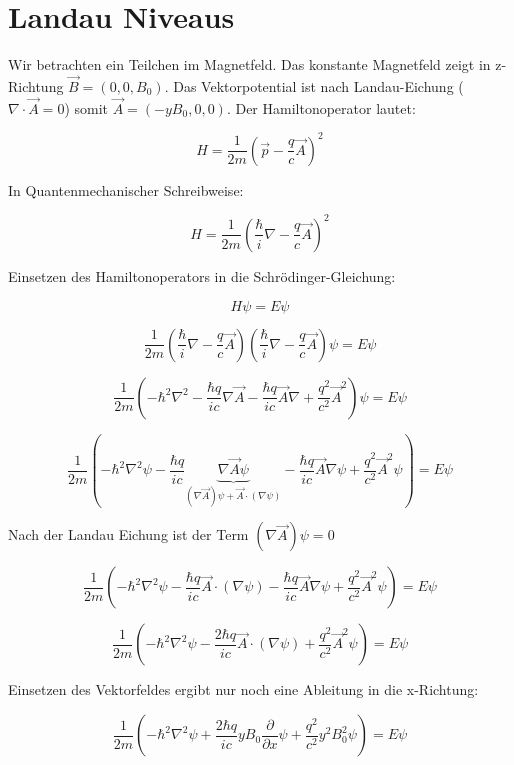 



\section*{Landau Niveaus}

Wir betrachten ein Teilchen im Magnetfeld. Das konstante Magnetfeld zeigt in z-Richtung \(\vec B=(0,0,B_0)\). Das Vektorpotential ist nach Landau-Eichung (\(\nabla\cdot\vec A = 0\)) somit \(\vec A = (-yB_0,0,0)\). Der Hamiltonoperator lautet:

\[H=\frac{1}{2m}\left(\vec p - \frac{q}{c}\vec A\right)^2 \]


In Quantenmechanischer Schreibweise:

\[H=\frac{1}{2m}\left(\frac{\hbar}{i}\nabla - \frac{q}{c}\vec A\right)^2 \]

Einsetzen des Hamiltonoperators in die Schrödinger-Gleichung:

\[H\psi = E\psi\]

\[ \frac{1}{2m}\left(\frac{\hbar}{i}\nabla - \frac{q}{c}\vec A\right)\left(\frac{\hbar}{i}\nabla - \frac{q}{c}\vec A\right)\psi = E\psi \]

\[ \frac{1}{2m}\left(-\hbar^2\nabla^2 -\frac{\hbar q}{ic}\nabla \vec A -\frac{\hbar q}{ic} \vec A \nabla  + \frac{q^2}{c^2}\vec A^2 \right) \psi = E\psi \]


\[ \frac{1}{2m}\left(-\hbar^2\nabla^2\psi -\frac{\hbar q}{ic}\underbrace{\nabla \vec A\psi}_{(\nabla \vec A)\psi + \vec A\cdot(\nabla\psi)} -\frac{\hbar q}{ic} \vec A \nabla\psi  + \frac{q^2}{c^2}\vec A^2\psi \right) = E\psi \]

Nach der Landau Eichung ist der Term \((\nabla \vec A)\psi = 0\)

\[ \frac{1}{2m}\left(-\hbar^2\nabla^2\psi -\frac{\hbar q}{ic}\vec A\cdot(\nabla\psi) -\frac{\hbar q}{ic} \vec A \nabla\psi  + \frac{q^2}{c^2}\vec A^2\psi \right) = E\psi \]

\[ \frac{1}{2m}\left(-\hbar^2\nabla^2\psi - \frac{2 \hbar q}{ic}\vec A\cdot(\nabla\psi) + \frac{q^2}{c^2}\vec A^2\psi \right) = E\psi \]


Einsetzen des Vektorfeldes ergibt nur noch eine Ableitung in die x-Richtung:


\[ \frac{1}{2m}\left(-\hbar^2\nabla^2\psi + \frac{2 \hbar q}{ic} yB_0 \frac{\partial}{\partial x} \psi + \frac{q^2}{c^2}y^2B_0^2\psi \right) = E\psi \]

